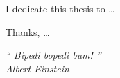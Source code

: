 \newpage

\begin{dedicatoria}
    \vspace*{\fill}
    \hfill
    \begin{minipage}{.6\textwidth}
        I dedicate this thesis to \dots
    \end{minipage}
\end{dedicatoria}
 
\begin{agradecimentos}
	Thanks, \dots
\end{agradecimentos}

\begin{epigrafe}
\vspace*{\fill}

\begin{flushright}
    \hspace{7.5cm}
    \textit{
        ``
        Bipedi bopedi bum!
        ''
    } \\
        \textit{Albert Einstein}
\end{flushright}
\end{epigrafe}
